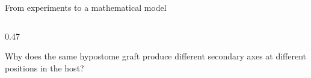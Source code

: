 \begin{frame}{From experiments to a mathematical model}
\begin{columns}[T,onlytextwidth]
    \begin{column}{0.47\textwidth}
      \begin{minipage}[t][1.55cm][t]{\linewidth}
        \vspace{0pt}
      {Why does the same hypostome graft produce different secondary axes at different positions in the host?}
      \end{minipage}
    \end{column}

  \end{columns}

  \vfill


\end{frame}